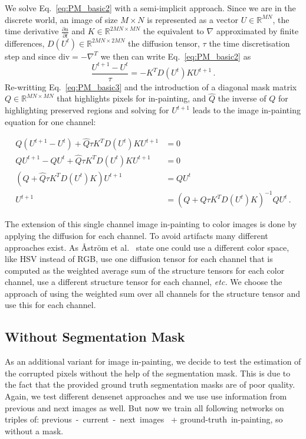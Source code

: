 We solve Eq.~\eqref{eq:PM_basic2} with a semi-implicit approach. Since we are in the discrete world, an image of size $M \times N$ is represented as a vector $U \in \mathbb{R}^{MN}$, the time derivative $\frac{\partial u}{\partial t}$ and $K \in \mathbb{R}^{2MN\times MN}$ the equivalent to $\nabla$ approximated by finite differences, $D(U^t) \in \mathbb{R}^{2MN\times2MN}$ the diffusion tensor, $\tau$ the time discretisation step and since $\text{div} = -\nabla^T$ we then can write Eq.~\eqref{eq:PM_basic2} as
\begin{equation}
\frac{U^{t+1}-U^t}{\tau}=-K^TD(U^t)KU^{t+1}\,.
\label{eq:PM_basic3}
\end{equation}
Re-writting Eq.~\eqref{eq:PM_basic3} and the introduction of a diagonal mask matrix $Q \in \mathbb{R}^{MN \times MN}$ that highlights pixels for in-painting, and $ \hat{Q}$ the inverse of $Q$ for highlighting preserved regions and solving for $U^{t+1}$ leads to the image in-painting equation for one channel:

\begin{equation} \label{eq:PM_final}
\begin{split}
Q(U^{t+1}-U^t)+\hat{Q}\tau K^TD(U^t)K U^{t+1} &= 0 \\
Q U^{t+1}-Q U^t+\hat{Q}\tau K^TD(U^t)K U^{t+1} &= 0 \\
 (Q+\hat{Q} \tau K^TD(U^t)K) U^{t+1} &= Q U^t\\
  U^{t+1} &= (Q+\hat{Q}\tau K^TD(U^t)K)^{-1}QU^t\,.
\end{split}
\end{equation}


The extension of this single channel image in-painting to color images is done by applying the diffusion for each channel. To avoid artifacts many different approaches exist. As {\AA}str{\"o}m et al.~\cite{aastrom11} state one could use a different color space, like HSV instead of RGB, use one diffusion tensor for each channel that is computed as the weighted average sum of the structure tensors for each color channel, use a different structure tensor for each channel, \textit{etc.} We choose the approach of using the weighted sum over all channels for the structure tensor and use this for each channel.

\subsection{Without Segmentation Mask}
\label{ssec:num42}

As an additional variant for image in-painting, we decide to test the estimation of the corrupted pixels without the help of the segmentation mask. This is due to the fact that the provided ground truth segmentation masks are of poor quality. Again, we test different densenet approaches and we use use information from previous and next images as well. But now we train all following networks on triples of: previous~-~current~-~next~images~ + ground-truth~in-painting, so without a mask.


